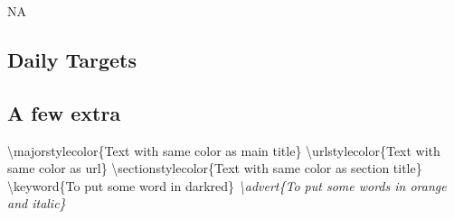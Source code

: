 \documentclass[
  english,
  a4paper]{article}
\newcommand\majorstylecolor[1]{\textcolor[RGB]{190,3,2}{#1}}
\newcommand\urlstylecolor[1]{\textcolor[RGB]{190,3,2}{#1}}
\newcommand\sectionstylecolor[1]{\textcolor[RGB]{0,153,255}{#1}}
\newcommand{\keyword}[1]{\textcolor{red!60!black}{#1}}
\newcommand{\advert}[1]{\textit{\textcolor{orange!80!black}{#1}}}
\begin{document}
NA

\hypertarget{daily-targets}{%
\subsection{Daily Targets 🎯}\label{daily-targets}}

\hypertarget{a-few-extra}{%
\subsection{A few extra}\label{a-few-extra}}

\majorstylecolor{\textbackslash majorstylecolor\{Text with same color as main title\}}  
\urlstylecolor{\textbackslash urlstylecolor\{Text with same color as url\}}  
\sectionstylecolor{\textbackslash sectionstylecolor\{Text with same color as section title\}}  
\keyword{\textbackslash keyword\{To put some word in darkred\}}  
\advert{\textbackslash advert\{To put some words in orange and italic\}}
\end{document}
